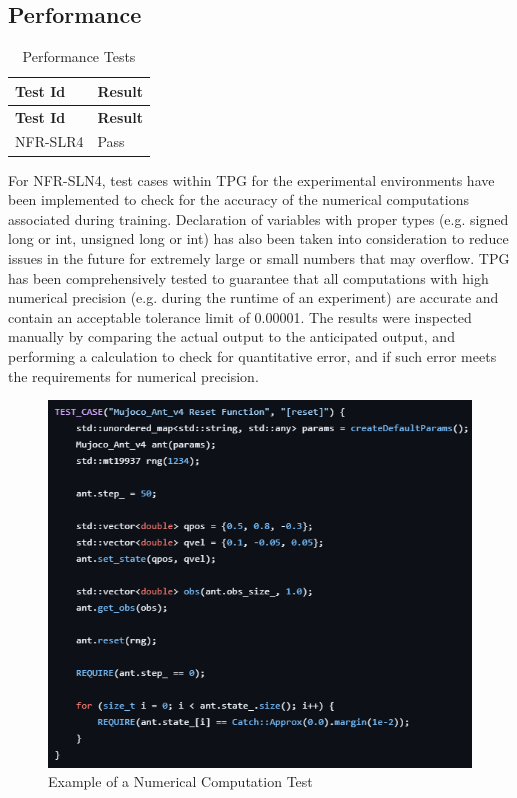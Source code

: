 \documentclass[12pt, titlepage]{article}
\begin{document}
\subsection{Performance}\label{performance}

\begin{center}
  \begin{longtable}{|p{4cm}|p{4cm}|}
  \caption{Performance Tests} \\
  \hline
  \textbf{Test Id} & \textbf{Result} \\
  \hline
  \endfirsthead
  \hline
  \textbf{Test Id} & \textbf{Result} \\
  \hline
  \endhead
  NFR-SLR4 & Pass \\
  \hline
  \end{longtable}
\end{center}

For NFR-SLN4, test cases within TPG for the experimental environments have been implemented to check for the accuracy of the numerical computations associated during training. Declaration of variables with proper types (e.g. signed long or int, unsigned long or int) has also been taken into consideration to reduce issues in the future for extremely large or small numbers that may overflow. TPG has been comprehensively tested to guarantee that all computations with high numerical precision (e.g. during the runtime of an experiment) are accurate and contain an acceptable tolerance limit of 0.00001. The results were inspected manually by comparing the actual output to the anticipated output, and performing a calculation to check for quantitative error, and if such error meets the requirements for numerical precision.

\begin{figure}[h]
  \centering
  \includegraphics[width=1\textwidth]{img/ant_test.png}
  \caption{Example of a Numerical Computation Test}
\end{figure}
\end{document}
